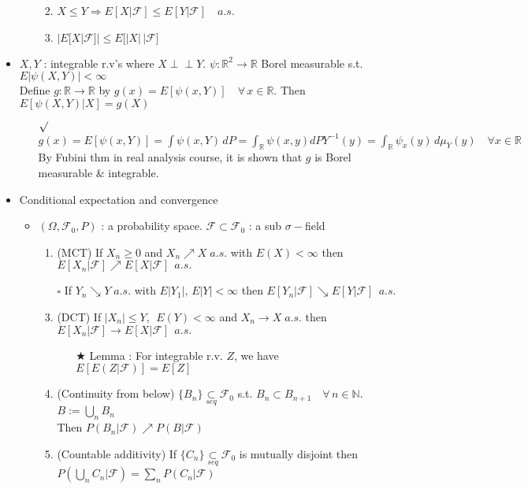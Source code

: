 \documentclass[12pt, A4]{article}
\newcommand{\indep}{\perp \!\!\! \perp}
\newcommand{\sq}{$\square$}
\newcommand{\rmk}{$\surd$}
\newcommand{\trick}{$\bigstar$}
\newcommand{\N}{\mathbb{N}}
\newcommand{\R}{\mathbb{R}}
\newcommand{\F}{\mathcal{F}}
\newcommand{\seq}{\underset{seq}{\subset}}
\newcommand{\foranyn}{\quad \forall \, n\in \N}
\begin{document}
\begin{itemize}
\begin{itemize}
\begin{enumerate}
\begin{itemize}
			\end{itemize}
			\item $X\leq Y \Rightarrow E[X|\F]\leq E[Y|\F]\quad a.s$.
			\item $\big|E[X|\F]\big|\leq E\big[|X| \,\big| \F\big]$
		\end{enumerate}
	\end{itemize}
	\item $X, Y$ : integrable r.v's where $X\indep Y$.\; $\psi :\R^2\rightarrow \R$ Borel measurable s.t. $E|\psi(X, Y)|<\infty$ \\ Define $g:\R\rightarrow \R$ by $g(x)=E[\psi(x, Y)]\quad \forall\, x\in \R$. \quad Then $E[\psi(X,Y)|X]=g(X)$
	\begin{itemize}
		\item[\rmk] $g(x)=E[\psi(x, Y)]=\int \psi(x, Y)\, dP =\int_\R \psi(x,y) dPY^{-1}(y)=\int_\R \psi_x(y)\, d\mu_Y(y) \quad \forall x\in \R$ \\ By Fubini thm in real analysis course, it is shown that $g$ is Borel measurable \& integrable.
	\end{itemize}
	\item Conditional expectation and convergence
	\begin{itemize}
		\item $(\Omega, \F_0, P)$ : a probability space.\; $\F\subset \F_0$ : a sub $\sigma-$field
		\begin{enumerate}
			\item (MCT) If $X_n\geq 0$ and $X_n\nearrow X\; a.s.$ with $E(X)<\infty$ then $E[X_n|\F]\nearrow E[X|\F]\;\, a.s.$
			\item[\sq] If $Y_n\searrow Y\; a.s.$ with $E|Y_1|,\, E|Y|<\infty$ then $E[Y_n|\F]\searrow E[Y|\F]\;\, a.s.$
			\item (DCT) If $|X_n|\leq Y,\,\; E(Y)<\infty$ and $X_n\rightarrow X\; a.s.$ then $E[X_n|\F]\rightarrow E[X|\F]\;\,a.s.$
			\begin{itemize}
				\item[\trick] Lemma : For integrable r.v. $Z$, we have $E[E(Z|\F)]=E[Z]$
			\end{itemize}
			\item (Continuity from below) $\{B_n\}\seq \F_0$ s.t. $B_n\subset B_{n+1}\foranyn$. \;$B:=\bigcup_n B_n$ \\ Then $P(B_n|\F)\nearrow P(B|\F)$
			\item (Countable additivity) If $\{C_n\}\seq \F_0$ is mutually disjoint then $P(\bigcup_n C_n|\F)=\sum_n P(C_n|\F)$     
		\end{enumerate} 

\end{itemize}
\end{itemize}
\end{document}
